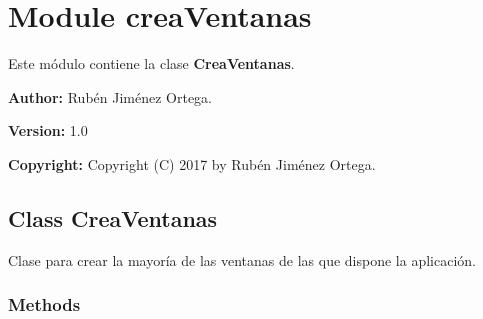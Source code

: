 %
%
%


\section{Module creaVentanas}

    \label{creaVentanas}
Este módulo contiene la clase \textbf{CreaVentanas}.

\textbf{Author:} Rubén Jiménez Ortega.



\textbf{Version:} 1.0



\textbf{Copyright:} Copyright (C) 2017 by Rubén Jiménez Ortega.





\subsection{Class CreaVentanas}

    \label{creaVentanas:CreaVentanas}
Clase para crear la mayoría de las ventanas de las que dispone la 
aplicación.



  \subsubsection{Methods}

    \label{creaVentanas:CreaVentanas:center}

